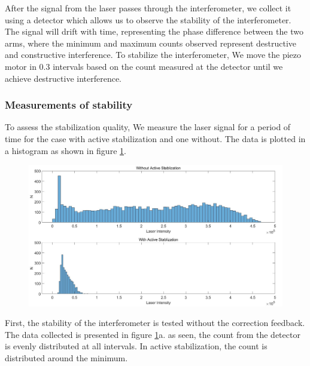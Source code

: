  After the signal from the laser passes through the interferometer, we collect it using a detector which allows us to observe the stability of the interferometer. The signal will drift with time, representing the  phase difference between the two arms, where the minimum and maximum counts observed represent destructive and constructive interference. To stabilize the interferometer, We move the piezo motor in 0.3 intervals based on the count measured at the detector until we achieve destructive interference.
\subsubsection{Measurements of stability}
To assess the stabilization quality, We measure the laser signal for a period of time for the case with active stabilization and one without. The data is plotted in a histogram as shown in figure \ref{fig:stablization_histogram}.
\begin{figure}[H]
	\centering
	\includegraphics[scale=0.32]{figures/StablizationHistogram.jpg}
	\caption{}
	\label{fig:stablization_histogram}
\end{figure}
First, the stability of the interferometer is tested without the correction feedback. The data collected is presented in figure \ref{fig:stablization_histogram}a. as seen, the count from the detector is evenly distributed at all intervals. In active stabilization, the count is distributed around the minimum.